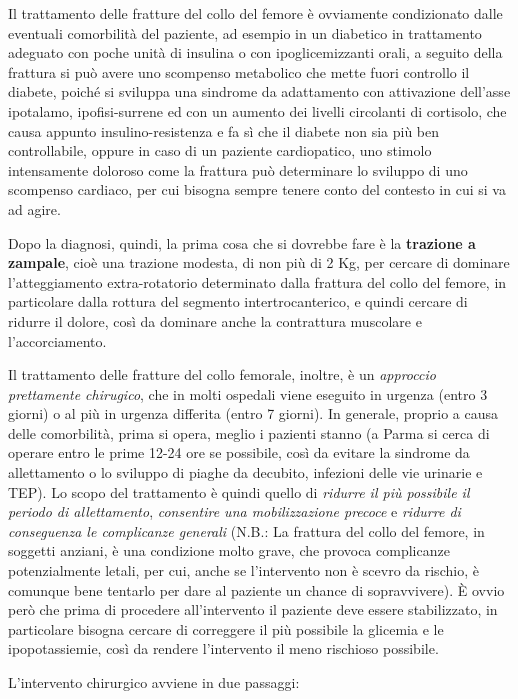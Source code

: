 Il trattamento delle fratture del collo del femore è ovviamente
condizionato dalle eventuali comorbilità del paziente, ad esempio in un
diabetico in trattamento adeguato con poche unità di insulina o con
ipoglicemizzanti orali, a seguito della frattura si può avere uno
scompenso metabolico che mette fuori controllo il diabete, poiché si
sviluppa una sindrome da adattamento con attivazione dell'asse
ipotalamo, ipofisi-surrene ed con un aumento dei livelli circolanti di
cortisolo, che causa appunto insulino-resistenza e fa sì che il diabete
non sia più ben controllabile, oppure in caso di un paziente
cardiopatico, uno stimolo intensamente doloroso come la frattura può
determinare lo sviluppo di uno scompenso cardiaco, per cui bisogna
sempre tenere conto del contesto in cui si va ad agire.

Dopo la diagnosi, quindi, la prima cosa che si dovrebbe fare è la
\textbf{trazione a zampale}, cioè una trazione modesta, di non più di 2
Kg, per cercare di dominare l'atteggiamento extra-rotatorio determinato
dalla frattura del collo del femore, in particolare dalla rottura del
segmento intertrocanterico, e quindi cercare di ridurre il dolore, così
da dominare anche la contrattura muscolare e l'accorciamento.

Il trattamento delle fratture del collo femorale, inoltre, è un
\emph{approccio prettamente chirugico}, che in molti ospedali viene
eseguito in urgenza (entro 3 giorni) o al più in urgenza differita
(entro 7 giorni). In generale, proprio a causa delle comorbilità, prima
si opera, meglio i pazienti stanno (a Parma si cerca di operare entro le
prime 12-24 ore se possibile, così da evitare la sindrome da
allettamento o lo sviluppo di piaghe da decubito, infezioni delle vie
urinarie e TEP). Lo scopo del trattamento è quindi quello di
\emph{ridurre il più possibile il periodo di allettamento},
\emph{consentire una mobilizzazione precoce} e \emph{ridurre di
conseguenza le complicanze generali} (N.B.: La frattura del collo del
femore, in soggetti anziani, è una condizione molto grave, che provoca
complicanze potenzialmente letali, per cui, anche se l'intervento non è
scevro da rischio, è comunque bene tentarlo per dare al paziente un
chance di sopravvivere). È ovvio però che prima di procedere
all'intervento il paziente deve essere stabilizzato, in particolare
bisogna cercare di correggere il più possibile la glicemia e le
ipopotassiemie, così da rendere l'intervento il meno rischioso
possibile.

L'intervento chirurgico avviene in due passaggi:

